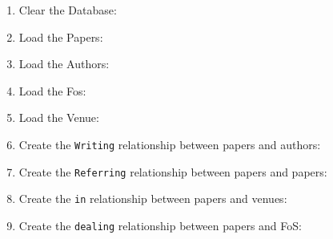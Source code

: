 \documentclass{Configuration_Files/PoliMi3i_thesis}
\begin{document}
\begin{enumerate}
    \item Clear the Database: 
    \item Load the Papers: 
    \item Load the Authors: 
    \item Load the Fos: 
    \item Load the Venue: 
    \item Create the \verb |Writing|  relationship between papers and authors:
    \item Create the \verb |Referring| relationship between papers and papers:
    \item Create the \verb |in| relationship between papers and venues:
    \item Create the \verb |dealing| relationship between papers and FoS:
\end{enumerate}
\newpage
\end{document}
